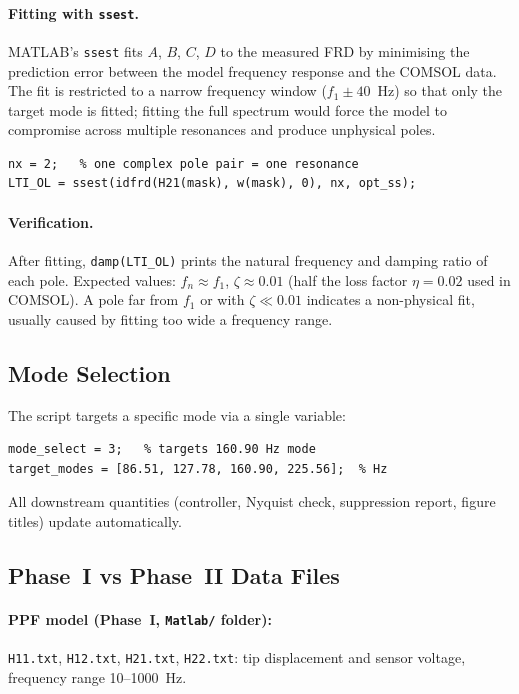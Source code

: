 \documentclass[12pt,a4paper]{article}
\begin{document}
\paragraph{Fitting with \texttt{ssest}.}
MATLAB's \texttt{ssest} fits $A$, $B$, $C$, $D$ to the measured FRD by
minimising the prediction error between the model frequency response and the
COMSOL data.  The fit is restricted to a narrow frequency window
($f_1 \pm 40$~Hz) so that only the target mode is fitted; fitting the full
spectrum would force the model to compromise across multiple resonances and produce
unphysical poles.

\begin{verbatim}
nx = 2;   % one complex pole pair = one resonance
LTI_OL = ssest(idfrd(H21(mask), w(mask), 0), nx, opt_ss);
\end{verbatim}

\paragraph{Verification.}
After fitting, \texttt{damp(LTI\_OL)} prints the natural frequency and damping
ratio of each pole.  Expected values: $f_n \approx f_1$, $\zeta \approx 0.01$
(half the loss factor $\eta = 0.02$ used in COMSOL).  A pole far from $f_1$ or
with $\zeta \ll 0.01$ indicates a non-physical fit, usually caused by fitting
too wide a frequency range.

\subsection{Mode Selection}

The script targets a specific mode via a single variable:
\begin{verbatim}
mode_select = 3;   % targets 160.90 Hz mode
target_modes = [86.51, 127.78, 160.90, 225.56];  % Hz
\end{verbatim}
All downstream quantities (controller, Nyquist check, suppression report, figure
titles) update automatically.

\subsection{Phase~I vs Phase~II Data Files}

\paragraph{PPF model (Phase~I, \texttt{Matlab/} folder):}
\texttt{H11.txt}, \texttt{H12.txt}, \texttt{H21.txt}, \texttt{H22.txt}:
tip displacement and sensor voltage, frequency range 10--1000~Hz.
\end{document}
